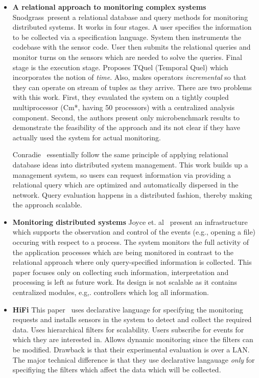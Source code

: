 \documentclass{sig-alt-full}
\begin{document}
{\begin{itemize}
\item{\bf A relational approach to monitoring complex systems} Snodgrass~\cite{}present a 
relational database and query methods for monitoring distributed 
systems. It works in four stages. A user specifies the information to be collected 
via a specification language. System then instruments the codebase with the sensor 
code. User then submits the relational queries and monitor turns on the sensors 
which are needed to solve the queries. Final stage is the execution stage. Proposes 
TQuel (Temporal Quel) which incorporates the notion of \emph{time}. Also, 
makes operators \emph{incremental} so that they can operate on stream of 
tuples as they arrive. There are two problems with this work. First, they 
evaulated the system on a tightly coupled multiprocessor (Cm*, having 50 processors) 
with a centralized analysis component. Second, the authors present only 
microbenchmark results to demonstrate the feasibility of the approach and 
its not clear if they have actually used the system for actual monitoring.


Conradie~\cite{conradie-sdne} essentially follow the same principle of applying 
relational database ideas into distributed system management. This work builds 
up a management system, so users can request information via providing a relational 
query which are optimized and automatically dispersed in the network. Query 
evaluation happens in a distributed fashion, thereby making the approach scalable. 

\item{\bf Monitoring distributed systems} Joyce et. al~\cite{} present an 
infrastructure which supports the observation and control of the events 
(e.g., opening a file) occuring with respect to a process. The system monitors 
the full activity of the application processes which are being monitored in 
contrast to the relational approach where only query-specified information 
is collected. This paper focuses only on collecting such information, 
interpretation and processing is left as future work. Its design is not 
scalable as it contains centralized modules, e.g,. controllers which log all information.

\item{\bf HiFi} This paper~\cite{alshaer99hifishort} uses declarative language 
for specifying the monitoring requests and installs sensors in the system 
to detect and collect the required data. Uses hierarchical filters for 
scalability. Users subscribe for events for which they are interested in. 
Allows dynamic monitoring since the filters can be modified. Drawback is 
that their experimental evaluation is over a LAN. The major technical 
difference is that they use declarative langauage \emph{only} for specifiying 
the filters which affect the data which will be collected.



\end{itemize}}
\end{document}
